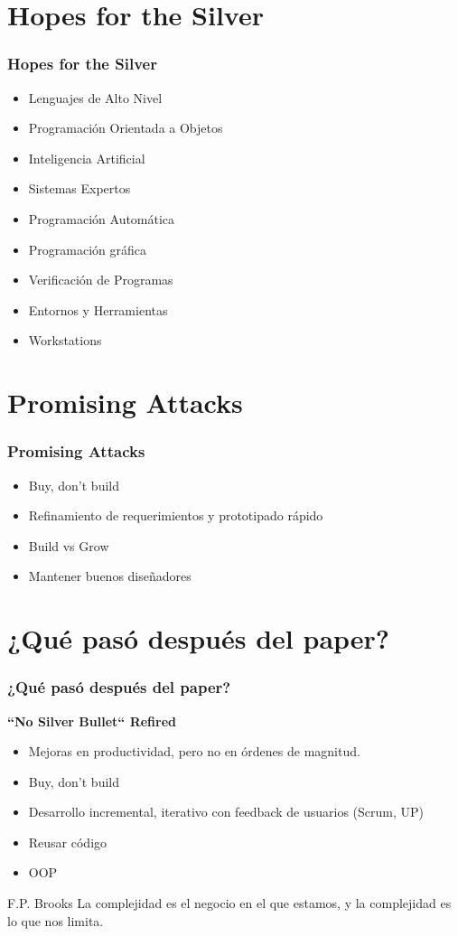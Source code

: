 \documentclass{beamer}
\begin{document}
\section{Hopes for the Silver}
\begin{frame}
  \frametitle{Hopes for the Silver}
  \begin{itemize}
    \item Lenguajes de Alto Nivel
    \item Programación Orientada a Objetos
    \item Inteligencia Artificial
    \item Sistemas Expertos
    \item Programación Automática
    \item Programación gráfica
    \item Verificación de Programas
    \item Entornos y Herramientas
    \item Workstations
  \end{itemize}
\end{frame}


\section{Promising Attacks}
\begin{frame}
  \frametitle{Promising Attacks}
  \begin{itemize}
    \item Buy, don't build
    \item Refinamiento de requerimientos y prototipado rápido
    \item Build vs Grow
    \item Mantener buenos diseñadores
  \end{itemize}
\end{frame}


\section{¿Qué pasó después del paper?}
\begin{frame}
  \frametitle{¿Qué pasó después del paper?}
  \textbf{``No Silver Bullet`` Refired}
  \begin{itemize}
    \item Mejoras en productividad, pero no en órdenes de magnitud.
    \item Buy, don't build
    \item Desarrollo incremental, iterativo con feedback de usuarios (Scrum, UP)
    \item Reusar código
    \item OOP
  \end{itemize}
  
  \begin{block}{F.P. Brooks}
La complejidad es el negocio en el que estamos, y la complejidad es lo que nos limita.
  \end{block}

\end{frame}
\end{document}

